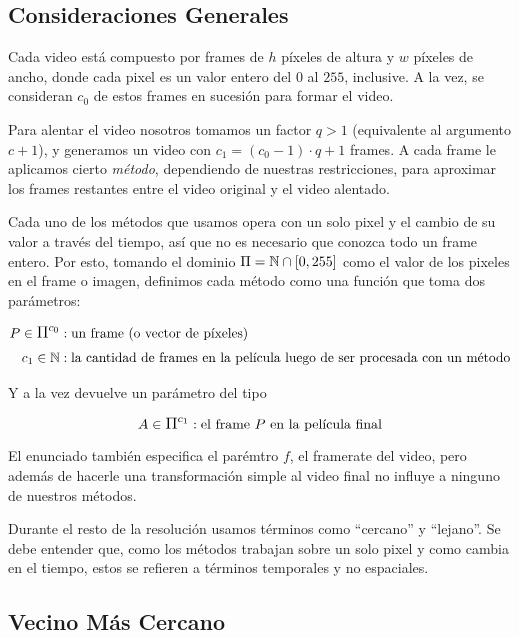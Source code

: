 \subsection{Consideraciones Generales}

Cada video est\'a compuesto por frames de $h$ p\'ixeles de altura y $w$ p\'ixeles de
ancho, donde cada pixel es un valor entero del $0$ al $255$, inclusive. A la
vez, se consideran $c_0$ de estos frames en sucesi\'on para formar el video.

Para alentar el video nosotros tomamos un factor $q > 1$ (equivalente al
argumento $c + 1$), y generamos un video con $c_1 = (c_0 - 1) \cdot q + 1$ frames. A cada frame
le aplicamos cierto \textit{m\'etodo}, dependiendo de nuestras restricciones,
para aproximar los frames restantes entre el video original y el video alentado.

Cada uno de los m\'etodos que usamos opera con un solo pixel y el cambio de su
valor a trav\'es del tiempo, as\'i que no es necesario que conozca todo un frame
entero. Por esto, tomando el dominio $\mathlarger{\Pi} = \mathbb{N} \cap \left[ 0, 255
\right]$ como el valor de los pixeles en el frame o imagen, definimos cada m\'etodo
como una funci\'on que toma dos par\'ametros:

\[
\begin{split}
P \in \mathlarger{\Pi^{c_0}} & : \text{un frame (o vector de p\'ixeles)} \\
c_1 \in \mathbb{N} & : \text{la cantidad de frames en la pel\'icula luego de ser procesada con un m\'etodo}
\end{split}
\]

Y a la vez devuelve un par\'ametro del tipo

\[
A \in \mathlarger{\Pi^{c_1}} : \text{el frame $P$ en la pel\'icula final}
\]

El enunciado tambi\'en especifica el par\'emtro $f$, el framerate del video,
pero adem\'as de hacerle una transformaci\'on simple al video final no influye a
ninguno de nuestros m\'etodos.

Durante el resto de la resoluci\'on usamos t\'erminos como ``cercano'' y
``lejano''. Se debe entender que, como los m\'etodos trabajan sobre un solo
pixel y como cambia en el tiempo, estos se refieren a t\'erminos temporales y
no espaciales.

\subsection{Vecino M\'as Cercano}

